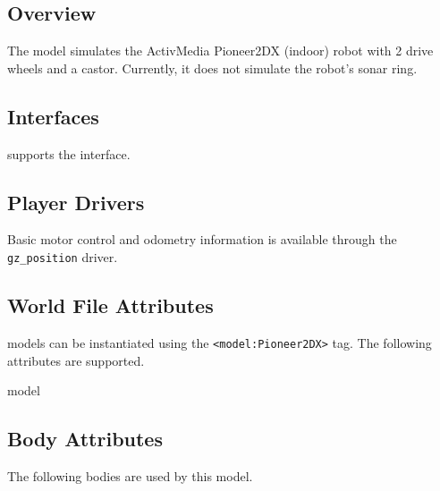 
\subsection{Overview}

The {\tt \modelName} model simulates the ActivMedia Pioneer2DX
(indoor) robot with 2 drive wheels and a castor.  Currently, it does
not simulate the robot's sonar ring.


\subsection{\libgazebo Interfaces}

{\tt \modelName} supports the  interface.


\subsection{Player Drivers}

Basic motor control and odometry information is available through the
{\tt gz\_position} driver.


\subsection{World File Attributes}

{\tt \modelName} models can be instantiated using the
\verb+<model:Pioneer2DX>+ tag.  The following attributes are
supported.

\begin{xmlattrtable}{model}{\modelName}
\modeldefaults
\end{xmlattrtable}

\subsection{Body Attributes}

The following bodies are used by this model.

\begin{bodyattrtable}
\bodydefaults
\end{bodyattrtable}

